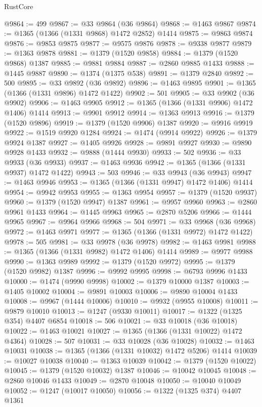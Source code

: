\begin{lexlean}{RustCore}
\begin{coremodule}
@9864 := 499
@9867 := @33 @9864 (@36 @9864)
@9868 := @1463 @9867
@9874 := @1365 (@1366 (@1331 @9868) @1472 @2852) @1414
@9875 := @9863 @9874
@9876 := @9853 @9875
@9877 := @9575 @9876
@9878 := @9338 @9877
@9879 := @1363 @9878
@9881 := @1379 (@1520 @9858)
@9884 := @1379 (@1520 @9868) @1387
@9885 := @9881 @9884
@9887 := @2860 @9885 @1433
@9888 := @1445 @9887
@9890 := @1374 (@1375 @538)
@9891 := @1379 @2840
@9892 := 500
@9895 := @33 @9892 (@36 @9892)
@9896 := @1463 @9895
@9901 := @1365 (@1366 (@1331 @9896) @1472 @1422)
@9902 := 501
@9905 := @33 @9902 (@36 @9902)
@9906 := @1463 @9905
@9912 := @1365 (@1366 (@1331 @9906) @1472 @1406) @1414
@9913 := @9901 @9912
@9914 := @1363 @9913
@9916 := @1379 (@1520 @9896)
@9919 := @1379 (@1520 @9906) @1387
@9920 := @9916 @9919
@9922 := @1519 @9920 @1284
@9924 := @1474 (@9914 @9922)
@9926 := @1379 @9924 @1387
@9927 := @1405 @9926
@9928 := @9891 @9927
@9930 := @9890 @9928 @1433
@9932 := @9888 (@1444 @9930)
@9933 := 502
@9936 := @33 @9933 (@36 @9933)
@9937 := @1463 @9936
@9942 := @1365 (@1366 (@1331 @9937) @1472 @1422)
@9943 := 503
@9946 := @33 @9943 (@36 @9943)
@9947 := @1463 @9946
@9953 := @1365 (@1366 (@1331 @9947) @1472 @1406) @1414
@9954 := @9942 @9953
@9955 := @1363 @9954
@9957 := @1379 (@1520 @9937)
@9960 := @1379 (@1520 @9947) @1387
@9961 := @9957 @9960
@9963 := @2860 @9961 @1433
@9964 := @1445 @9963
@9965 := @2870 @5206
@9966 := @1444 @9965
@9967 := @9964 @9966
@9968 := 504
@9971 := @33 @9968 (@36 @9968)
@9972 := @1463 @9971
@9977 := @1365 (@1366 (@1331 @9972) @1472 @1422)
@9978 := 505
@9981 := @33 @9978 (@36 @9978)
@9982 := @1463 @9981
@9988 := @1365 (@1366 (@1331 @9982) @1472 @1406) @1414
@9989 := @9977 @9988
@9990 := @1363 @9989
@9992 := @1379 (@1520 @9972)
@9995 := @1379 (@1520 @9982) @1387
@9996 := @9992 @9995
@9998 := @6793 @9996 @1433
@10000 := @1474 (@9990 @9998)
@10002 := @1379 @10000 @1387
@10003 := @1405 @10002
@10004 := @9891 @10003
@10006 := @9890 @10004 @1433
@10008 := @9967 (@1444 @10006)
@10010 := @9932 (@9955 @10008)
@10011 := @9879 @10010
@10013 := @1247 (@9330 @10011)
@10017 := @1322 (@1325 @354) @4407 @6854
@10018 := 506
@10021 := @33 @10018 (@36 @10018)
@10022 := @1463 @10021
@10027 := @1365 (@1366 (@1331 @10022) @1472 @4364)
@10028 := 507
@10031 := @33 @10028 (@36 @10028)
@10032 := @1463 @10031
@10038 := @1365 (@1366 (@1331 @10032) @1472 @5206) @1414
@10039 := @10027 @10038
@10040 := @1363 @10039
@10042 := @1379 (@1520 @10022)
@10045 := @1379 (@1520 @10032) @1387
@10046 := @10042 @10045
@10048 := @2860 @10046 @1433
@10049 := @2870 @10048
@10050 := @10040 @10049
@10052 := @1247 (@10017 @10050)
@10056 := @1322 (@1325 @374) @4407 @1361

\end{coremodule}
\end{lexlean}
